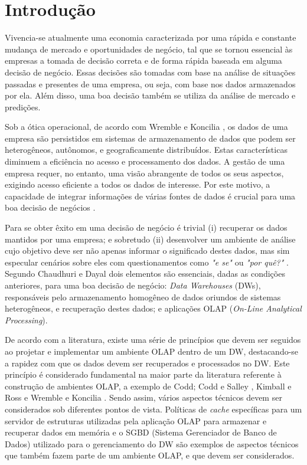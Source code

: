 \chapter{Introdução}
\label{intro}

Vivencia-se atualmente uma economia caracterizada por uma rápida e constante mudança de mercado e oportunidades de negócio, 
tal que se tornou essencial às empresas a tomada de decisão correta e de forma rápida baseada em alguma decisão de negócio. 
Essas decisões são tomadas com base na análise de situações passadas e presentes de uma empresa, ou seja, com base nos dados armazenados por ela. 
Além disso, uma boa decisão também se utiliza da análise de mercado e predições.

Sob a ótica operacional, de acordo com Wremble e Koncilia \cite{wrembel2007data}, os dados de uma empresa são persistidos em sistemas de armazenamento 
de dados que podem ser heterogêneos, autônomos, e geograficamente distribuídos. Estas características diminuem a eficiência no acesso e processamento dos dados. 
A gestão de uma empresa requer, no entanto, uma visão abrangente de todos os seus aspectos, exigindo acesso eficiente a todos os dados de interesse. 
Por este motivo, a capacidade de integrar informações de várias fontes de dados é crucial para uma boa decisão de negócios \cite{wrembel2007data}.

Para se obter êxito em uma decisão de negócio é trivial (i) recuperar os dados mantidos por uma empresa; e sobretudo 
(ii) desenvolver um ambiente de análise cujo objetivo deve ser não apenas informar o significado destes dados, 
mas sim especular cenários sobre eles com questionamentos como \textit{"e se"} ou \textit{"por quê?"} \cite{codd1998providing}. 
Segundo Chaudhuri e Dayal \cite{chaudhuri1997overview} dois elementos são essenciais, dadas as condições anteriores, para uma boa decisão de negócio: 
\textit{Data Warehouses} (DWs), responsáveis pelo armazenamento homogêneo de dados oriundos de sistemas heterogêneos, e recuperação destes dados; 
e aplicações OLAP (\textit{On-Line Analytical Processing}).

De acordo com a literatura, existe uma série de princípios que devem ser seguidos ao projetar e implementar um ambiente OLAP dentro de um DW, destacando-se a rapidez com que os dados devem ser recuperados e processados no DW. Este princípio é considerado fundamental 
na maior parte da literatura referente à construção de ambientes OLAP, a exemplo de Codd; Codd e Salley \cite{codd1998providing}, Kimball e Ross \cite{kimball2002dw} 
e Wremble e Koncilia \cite{wrembel2007data}. Sendo assim, vários aspectos técnicos devem ser considerados sob diferentes pontos de vista. 
Políticas de \textit{cache} específicas para um servidor de estruturas utilizadas pela aplicação OLAP para armazenar e recuperar dados em memória 
e o SGBD (Sistema Gerenciador de Banco de Dados) utilizado para o gerenciamento do DW são exemplos de aspectos técnicos que também fazem parte de um ambiente OLAP, 
e que devem ser considerados. 

